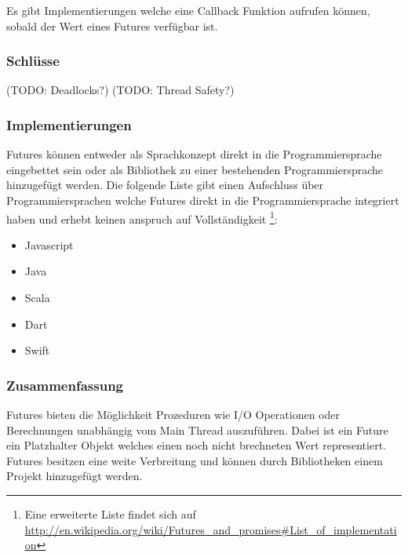 Es gibt Implementierungen welche eine Callback Funktion aufrufen können, sobald der Wert eines Futures verfügbar ist. 

\subsubsection{Schlüsse}
(TODO: Deadlocks?)
(TODO: Thread Safety?)

\subsubsection{Implementierungen}
Futures können entweder als Sprachkonzept direkt in die Programmiersprache eingebettet sein oder als Bibliothek zu einer bestehenden Programmiersprache hinzugefügt werden. Die folgende Liste gibt einen Aufschluss über Programmiersprachen welche Futures direkt in die Programmiersprache integriert haben und erhebt keinen anspruch auf Vollständigkeit \footnote{Eine erweiterte Liste findet sich auf \url{http://en.wikipedia.org/wiki/Futures_and_promises#List_of_implementation}}:

\begin{itemize}
  \item Javascript
  \item Java
  \item Scala
  \item Dart
  \item Swift
\end{itemize}  

\subsubsection{Zusammenfassung}
Futures bieten die Möglichkeit Prozeduren wie I/O Operationen oder Berechnungen unabhängig vom Main Thread auszuführen. Dabei ist ein Future ein Platzhalter Objekt welches einen noch nicht brechneten Wert representiert. Futures besitzen eine weite Verbreitung und können durch Bibliotheken einem Projekt hinzugefügt werden.